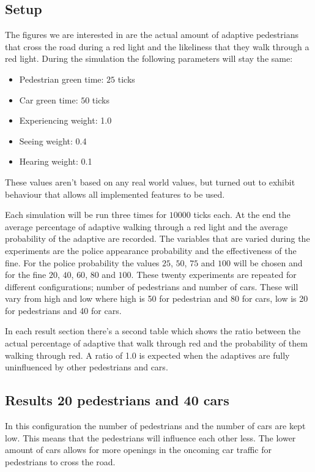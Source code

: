 \documentclass[a4paper]{article}
\begin{document}
\subsection{Setup}
The figures we are interested in are the actual amount of adaptive pedestrians that cross the road during a red light and the likeliness that they walk through a red light. During the simulation the following parameters will stay the same:
\begin{itemize}
\item Pedestrian green time: $25$ ticks
\item Car green time: $50$ ticks
\item Experiencing weight: 1.0
\item Seeing weight: 0.4
\item Hearing weight: 0.1
\end{itemize}
These values aren't based on any real world values, but turned out to exhibit behaviour that allows all implemented features to be used.

Each simulation will be run three times for $10000$ ticks each. At the end the average percentage of adaptive walking through a red light and the average probability of the adaptive are recorded. The variables that are varied during the experiments are the police appearance probability and the effectiveness of the fine. For the police probability the values $25$, $50$, $75$ and $100$ will be chosen and for the fine $20$, $40$, $60$, $80$ and $100$. These twenty experiments are repeated for different configurations; number of pedestrians and number of cars. These will vary from high and low where high is 50 for pedestrian and 80 for cars, low is 20 for pedestrians and 40 for cars.

In each result section there's a second table which shows the ratio between the actual percentage of adaptive that walk through red and the probability of them walking through red. A ratio of 1.0 is expected when the adaptives are fully uninfluenced by other pedestrians and cars.

\clearpage
\subsection{Results 20 pedestrians and 40 cars}
In this configuration the number of pedestrians and the number of cars are kept low. This means that the pedestrians will influence each other less. The lower amount of cars allows for more openings in the oncoming car traffic for pedestrians to cross the road.
\end{document}
